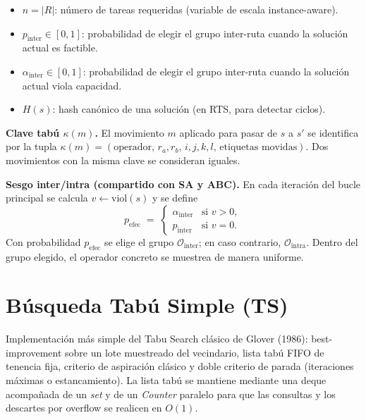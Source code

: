 \documentclass[12pt, a4paper]{article}
\begin{document}
\begin{itemize}
          RTS es dinámica y vive en $[\tau_{\min}, \tau_{\max}]$.
    \item $n = |R|$: número de tareas requeridas (variable de escala
          instance-aware).
    \item $p_{\mathrm{inter}} \in [0,1]$: probabilidad de elegir el grupo
          inter-ruta cuando la solución actual es factible.
    \item $\alpha_{\mathrm{inter}} \in [0,1]$: probabilidad de elegir el grupo
          inter-ruta cuando la solución actual viola capacidad.
    \item $H(s)$: hash canónico de una solución (en RTS, para detectar ciclos).
\end{itemize}

\medskip
\noindent
\textbf{Clave tabú $\kappa(m)$.} El movimiento $m$ aplicado para pasar de $s$
a $s'$ se identifica por la tupla
$\kappa(m) = (\mathrm{operador},\, r_a, r_b,\, i, j, k, l,\, \text{etiquetas
movidas})$. Dos movimientos con la misma clave se consideran iguales.

\medskip
\noindent
\textbf{Sesgo inter/intra (compartido con SA y ABC).} En cada iteración del
bucle principal se calcula $v \leftarrow \mathrm{viol}(s)$ y se define
\[
p_{\mathrm{efec}} \;=\;
\begin{cases}
  \alpha_{\mathrm{inter}} & \text{si } v > 0, \\
  p_{\mathrm{inter}}     & \text{si } v = 0.
\end{cases}
\]
Con probabilidad $p_{\mathrm{efec}}$ se elige el grupo
$\mathcal{O}_{\mathrm{inter}}$; en caso contrario,
$\mathcal{O}_{\mathrm{intra}}$. Dentro del grupo elegido, el operador concreto
se muestrea de manera uniforme.

\section{Búsqueda Tabú Simple (TS)}

Implementación más simple del Tabu Search clásico de Glover (1986):
best-improvement sobre un lote muestreado del vecindario, lista tabú FIFO de
tenencia fija, criterio de aspiración clásico y doble criterio de parada
(iteraciones máximas o estancamiento). La lista tabú se mantiene mediante una
deque acompañada de un \emph{set} y de un \emph{Counter} paralelo para que las
consultas y los descartes por overflow se realicen en $O(1)$.
\end{document}
